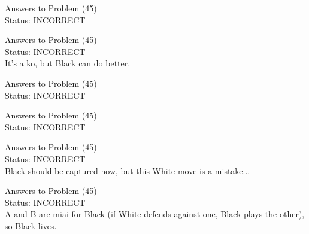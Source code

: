 \documentclass[11pt]{article}
\begin{document}
\begin{minipage}[t]{0.5\textwidth}
  {\centering
  
  Answers to Problem (45)\\
  Status: INCORRECT\\
  
  }
\end{minipage}
\begin{minipage}[t]{0.5\textwidth}
  {\centering
  
  Answers to Problem (45)\\
  Status: INCORRECT\\
  It's a ko, but Black can do better.\\
  }
\end{minipage}
\begin{minipage}[t]{0.5\textwidth}
  {\centering
  
  Answers to Problem (45)\\
  Status: INCORRECT\\
  
  }
\end{minipage}
\begin{minipage}[t]{0.5\textwidth}
  {\centering
  
  Answers to Problem (45)\\
  Status: INCORRECT\\
  
  }
\end{minipage}
\begin{minipage}[t]{0.5\textwidth}
  {\centering
  
  Answers to Problem (45)\\
  Status: INCORRECT\\
  Black should be captured now, but this White move is a mistake...\\
  }
\end{minipage}
\begin{minipage}[t]{0.5\textwidth}
  {\centering
  
  Answers to Problem (45)\\
  Status: INCORRECT\\
  A and B are miai for Black (if White defends against one, Black plays the other), so Black lives.\\
  }
\end{minipage}
\end{document}
